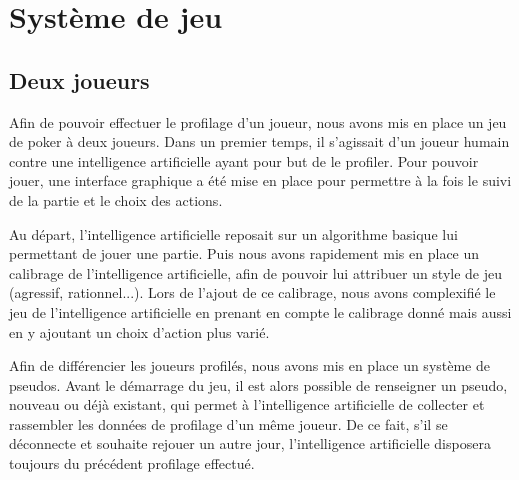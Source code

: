 \documentclass{report}
\begin{document}

%
%
%
%
%
%
%
%

\section{Système de jeu}

\subsection{Deux joueurs}
\hspace{0.5cm}Afin de pouvoir effectuer le profilage d'un joueur, nous avons mis en place un jeu de poker à deux joueurs. Dans un premier temps, il s'agissait d'un joueur humain contre une intelligence artificielle ayant pour but de le profiler. Pour pouvoir jouer, une interface graphique a été mise en place pour permettre à la fois le suivi de la partie et le choix des actions.\par
Au départ, l'intelligence artificielle reposait sur un algorithme basique lui permettant de jouer une partie. Puis nous avons rapidement mis en place un calibrage de l'intelligence artificielle, afin de pouvoir lui attribuer un style de jeu (agressif, rationnel...). Lors de l'ajout de ce calibrage, nous avons complexifié le jeu de l'intelligence artificielle en prenant en compte le calibrage donné mais aussi en y ajoutant un choix d'action plus varié.\par
Afin de différencier les joueurs profilés, nous avons mis en place un système de pseudos. Avant le démarrage du jeu, il est alors possible de renseigner un pseudo, nouveau ou déjà existant, qui permet à l'intelligence artificielle de collecter et rassembler les données de profilage d'un même joueur. De ce fait, s'il se déconnecte et souhaite rejouer un autre jour, l'intelligence artificielle disposera toujours du précédent profilage effectué.\par
\end{document}
